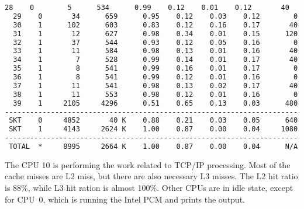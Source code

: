 \begin{lstlisting}[language=TeX]
  28    0        5      534      0.99    0.12    0.01    0.12       40
  29    0       34      659      0.95    0.12    0.03    0.12        0
  30    1      102      603      0.83    0.12    0.16    0.17       40
  31    1       12      627      0.98    0.34    0.01    0.15      120
  32    1       37      544      0.93    0.12    0.05    0.16        0
  33    1       11      584      0.98    0.13    0.01    0.16       40
  34    1        7      528      0.99    0.14    0.01    0.17       40
  35    1        8      541      0.99    0.16    0.01    0.17        0
  36    1        8      541      0.99    0.12    0.01    0.16        0
  37    1       11      541      0.98    0.13    0.02    0.17       40
  38    1       11      553      0.98    0.12    0.01    0.16        0
  39    1     2105     4296      0.51    0.65    0.13    0.03      480
-------------------------------------------------------------------------
 SKT    0     4852       40 K    0.88    0.21    0.03    0.05      640
 SKT    1     4143     2624 K    1.00    0.87    0.00    0.04     1080
-------------------------------------------------------------------------
 TOTAL  *     8995     2664 K    1.00    0.87    0.00    0.04      N/A
\end{lstlisting}

The CPU 10 is performing the work related to TCP/IP processing.
Most of the cache misses are L2 miss, but there are also necessary L3 misses.
The L2 hit ratio is 88\%, while L3 hit ration is almost 100\%.
Other CPUs are in idle state, except for CPU~0, which is running the Intel PCM and prints the output.
